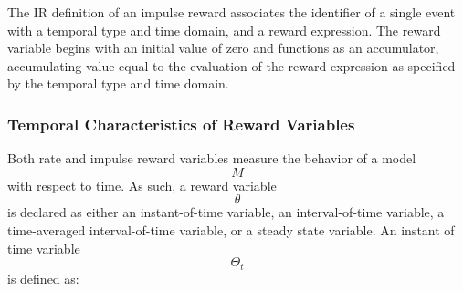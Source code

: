 \documentclass[]{article}
\begin{document}
The IR definition of an impulse reward associates the identifier of a
single event with a temporal type and time domain, and a reward
expression. The reward variable begins with an initial value of zero and
functions as an accumulator, accumulating value equal to the evaluation
of the reward expression as specified by the temporal type and time
domain.

\subsubsection{Temporal Characteristics of Reward
Variables}\label{temporal-characteristics-of-reward-variables}

Both rate and impulse reward variables measure the behavior of a model
\[M\] with respect to time. As such, a reward variable \[\theta\] is
declared as either an instant-of-time variable, an interval-of-time
variable, a time-averaged interval-of-time variable, or a steady state
variable. An instant of time variable \[\Theta_t\] is defined as:
\end{document}
